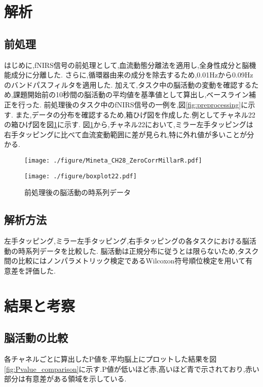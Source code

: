 \section{解析}
\subsection{前処理}
はじめに,fNIRS信号の前処理として,血流動態分離法を適用し,全身性成分と脳機能成分に分離した.\cite{Yamada}
さらに,循環器由来の成分を除去するため,0.01Hzから0.09Hzのバンドパスフィルタを適用した.\cite{Klein}
加えて,タスク中の脳活動の変動を確認するため,課題開始前の10秒間の脳活動の平均値を基準値として算出し,ベースライン補正を行った.
前処理後のタスク中のfNIRS信号の一例を,図\ref{fig:preprocessing}に示す.
また,データの分布を確認するため,箱ひげ図を作成した.例としてチャネル22の箱ひげ図を図\ref{fig:boxplot}に示す.
図\ref{fig:boxplot}から,チャネル22において,ミラー左手タッピングは右手タッピングに比べて血流変動範囲に差が見られ,特に外れ値が多いことが分かる.

\begin{figure}[htb]
    \centering
    \begin{minipage}{0.65\hsize}
        \texttt{[image: ./figure/Mineta\_CH28\_ZeroCorrMillarR.pdf]}
        \label{fig:preprocessing}
    \end{minipage}

    \begin{minipage}{0.65\hsize}
        \texttt{[image: ./figure/boxplot22.pdf]}
        \label{fig:boxplot}
    \end{minipage}

    \caption{前処理後の脳活動の時系列データ}
\end{figure}

\subsection{解析方法}
左手タッピング,ミラー左手タッピング,右手タッピングの各タスクにおける脳活動の時系列データを比較した.
脳活動は正規分布に従うとは限らないため,タスク間の比較にはノンパラメトリック検定であるWilcoxon符号順位検定を用いて有意差を評価した.

\section{結果と考察}
\subsection{脳活動の比較}
各チャネルごとに算出したP値を,平均脳上にプロットした結果を図\ref{fig:Pvalue_comparison}に示す.P値が低いほど赤,高いほど青で示されており,赤い部分は有意差がある領域を示している.

